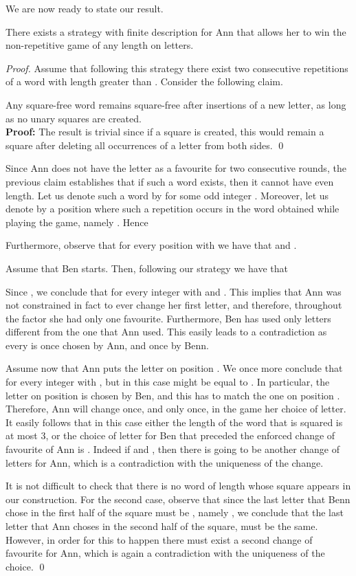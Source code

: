 \documentclass[runningheads,fleqn]{llncs}
\begin{document}
We are now ready to state our result.
\begin{theorem}
There exists a strategy with finite description for Ann that allows her to win the non-repetitive game of any length on  letters.
\end{theorem}
\begin{proof}
Assume that following this strategy there exist two consecutive repetitions of a word with length greater than . Consider the following claim.

\medskip{}\qquad
Any square-free word remains square-free after insertions of a new letter, as long as no unary squares are created.\\
{\bf Proof:}\qquad
The result is trivial since if a square is created, this would remain a square after deleting all occurrences of a letter from both sides.
\hfill\qed\medskip

Since Ann does not have the letter  as a favourite for two consecutive rounds, the previous claim establishes that if such a word exists, then it cannot have even length. Let us denote such a word by  for some odd integer . Moreover, let us denote by  a position where such a repetition occurs in the word obtained while playing the game, namely . Hence

Furthermore, observe that for every position  with  we have that  and .
 
Assume that Ben starts. Then, following our strategy we have that 



Since , we conclude that  for every integer  with  and . This implies that Ann was not constrained in fact to ever change her first letter, and therefore, throughout the factor she had only one favourite. Furthermore, Ben has used only letters different from the one that Ann used. This easily leads to a contradiction as every  is once chosen by Ann, and once by Benn.

Assume now that Ann puts the letter on position . We once more conclude that  for every integer  with , but in this case  might be equal to . In particular, the letter on position  is chosen by Ben, and this has to match the one on position . Therefore, Ann will change once, and only once, in the game her choice of letter. It easily follows that in this case either the length of the word that is squared is at most 3, or the choice of letter for Ben that preceded the enforced change of favourite of Ann is . Indeed if  and , then there is going to be another change of letters for Ann, which is a contradiction with the uniqueness of the change.

It is not difficult to check that there is no word of length  whose square appears in our construction. For the second case, observe that since the last letter that Benn chose in the first half of the square must be , namely , we conclude that the last letter that Ann choses in the second half of the square, must be the same. However, in order for this to happen there must exist a second change of favourite for Ann, which is again a contradiction with the uniqueness of the choice.
\qed\end{proof}



\end{document}
